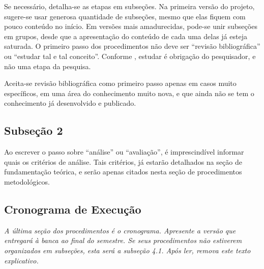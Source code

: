Se necessário, detalha-se as etapas em subseções. Na primeira versão do projeto, sugere-se usar generosa quantidade de subseções, mesmo que elas fiquem com pouco conteúdo no início. Em versões mais amadurecidas, pode-se unir subseções em grupos, desde que a apresentação do conteúdo de cada uma delas já esteja saturada.
O primeiro passo dos procedimentos não deve ser “revisão bibliográfica” ou “estudar tal e tal conceito”. Conforme , estudar é obrigação do pesquisador, e não uma etapa da pesquisa.

Aceita-se revisão bibliográfica como primeiro passo apenas em casos muito específicos, em uma área do conhecimento muito nova, e que ainda não se tem o conhecimento já desenvolvido e publicado. 

\subsection{Subseção 2}

Ao escrever o passo sobre “análise” ou “avaliação”, é imprescindível informar quais os critérios de análise. Tais critérios, já estarão detalhados na seção de fundamentação teórica, e serão apenas citados nesta seção de procedimentos metodológicos.

\subsection{Cronograma de Execução}

\textit{A última seção dos procedimentos é o cronograma. Apresente a versão que entregará à banca ao final do semestre. Se seus procedimentos não estiverem organizados em subseções, esta será a subseção 4.1. Após ler, remova este texto explicativo.}

